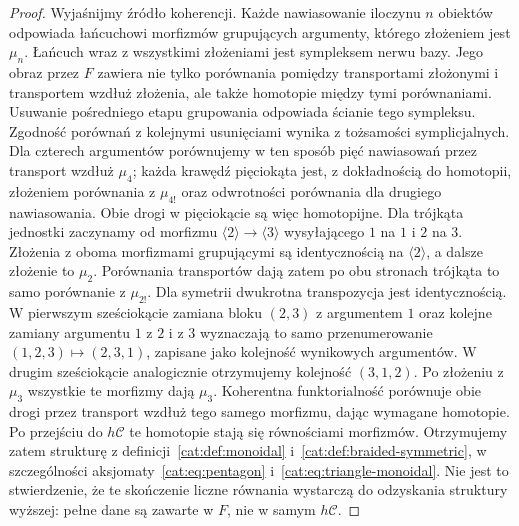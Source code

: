 \begin{proof}
Wyjaśnijmy źródło koherencji. Każde nawiasowanie iloczynu $n$ obiektów odpowiada łańcuchowi morfizmów grupujących argumenty, którego złożeniem jest $\mu_n$. Łańcuch wraz z wszystkimi złożeniami jest sympleksem nerwu bazy. Jego obraz przez $F$ zawiera nie tylko porównania pomiędzy transportami złożonymi i transportem wzdłuż złożenia, ale także homotopie między tymi porównaniami. Usuwanie pośredniego etapu grupowania odpowiada ścianie tego sympleksu. Zgodność porównań z kolejnymi usunięciami wynika z tożsamości symplicjalnych. Dla czterech argumentów porównujemy w ten sposób pięć nawiasowań przez transport wzdłuż $\mu_4$; każda krawędź pięciokąta jest, z dokładnością do homotopii, złożeniem porównania z $\mu_{4!}$ oraz odwrotności porównania dla drugiego nawiasowania. Obie drogi w pięciokącie są więc homotopijne. Dla trójkąta jednostki zaczynamy od morfizmu $\langle2\rangle\to\langle3\rangle$ wysyłającego $1$ na $1$ i $2$ na $3$. Złożenia z oboma morfizmami grupującymi są identycznością na $\langle2\rangle$, a dalsze złożenie to $\mu_2$. Porównania transportów dają zatem po obu stronach trójkąta to samo porównanie z $\mu_{2!}$. Dla symetrii dwukrotna transpozycja jest identycznością. W pierwszym sześciokącie zamiana bloku $(2,3)$ z argumentem $1$ oraz kolejne zamiany argumentu $1$ z $2$ i z $3$ wyznaczają to samo przenumerowanie $(1,2,3)\mapsto(2,3,1)$, zapisane jako kolejność wynikowych argumentów. W drugim sześciokącie analogicznie otrzymujemy kolejność $(3,1,2)$. Po złożeniu z $\mu_3$ wszystkie te morfizmy dają $\mu_3$. Koherentna funktorialność porównuje obie drogi przez transport wzdłuż tego samego morfizmu, dając wymagane homotopie. Po przejściu do $h\mathcal C$ te homotopie stają się równościami morfizmów. Otrzymujemy zatem strukturę z definicji~\ref{cat:def:monoidal} i~\ref{cat:def:braided-symmetric}, w szczególności aksjomaty~\eqref{cat:eq:pentagon} i~\eqref{cat:eq:triangle-monoidal}. Nie jest to stwierdzenie, że te skończenie liczne równania wystarczą do odzyskania struktury wyższej: pełne dane są zawarte w $F$, nie w samym $h\mathcal C$.
\end{proof}


